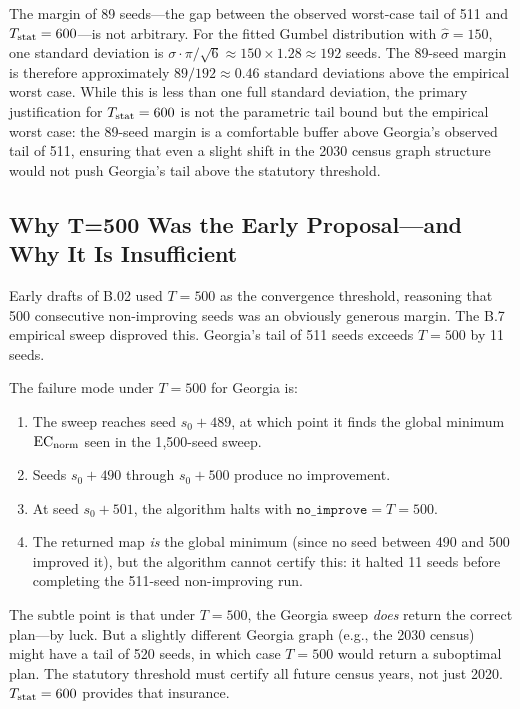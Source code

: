 The margin of 89 seeds---the gap between the observed worst-case tail of 511
and $T_{\mathrm{stat}} = 600$---is not arbitrary.
For the fitted Gumbel distribution with $\hat\sigma = 150$, one standard deviation
is $\sigma \cdot \pi/\sqrt{6} \approx 150 \times 1.28 \approx 192$ seeds.
The 89-seed margin is therefore approximately $89/192 \approx 0.46$ standard
deviations above the empirical worst case.
While this is less than one full standard deviation, the primary justification
for $T_{\mathrm{stat}} = 600$ is not the parametric tail bound but the empirical worst case:
the 89-seed margin is a comfortable buffer above Georgia's observed tail of 511,
ensuring that even a slight shift in the 2030 census graph structure would not
push Georgia's tail above the statutory threshold.

\subsection{Why T=500 Was the Early Proposal---and Why It Is Insufficient}

Early drafts of B.02 used $T = 500$ as the convergence threshold, reasoning
that 500 consecutive non-improving seeds was an obviously generous margin.
The B.7 empirical sweep disproved this.
Georgia's tail of 511 seeds exceeds $T = 500$ by 11 seeds.

The failure mode under $T = 500$ for Georgia is:
\begin{enumerate}
\item The sweep reaches seed $s_0 + 489$, at which point it finds the global
      minimum $\mathrm{EC}_{\mathrm{norm}}$ seen in the 1{,}500-seed sweep.
\item Seeds $s_0 + 490$ through $s_0 + 500$ produce no improvement.
\item At seed $s_0 + 501$, the algorithm halts with $\mathtt{no\_improve} = T
      = 500$.
\item The returned map \emph{is} the global minimum (since no seed between
      490 and 500 improved it), but the algorithm cannot certify this:
      it halted 11 seeds before completing the 511-seed non-improving run.
\end{enumerate}

The subtle point is that under $T = 500$, the Georgia sweep \emph{does} return
the correct plan---by luck.
But a slightly different Georgia graph (e.g., the 2030 census) might have a
tail of 520 seeds, in which case $T = 500$ would return a suboptimal plan.
The statutory threshold must certify all future census years, not just 2020.
$T_{\mathrm{stat}} = 600$ provides that insurance.
